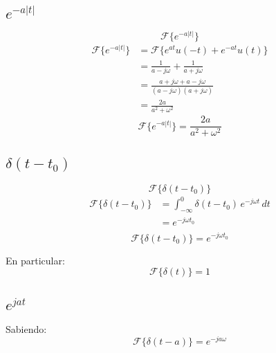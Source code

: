 \subsection{$e^{-a|t|}$}
\begin{equation*}
    \mathcal{F}\{e^{-a|t|}\}
\end{equation*}
\begin{equation*}
\begin{split}
    \mathcal{F}\{e^{-a|t|}\}
        &=\mathcal{F}\{e^{at}u(-t)+e^{-at}u(t)\}\\
        &=\frac{1}{a-j\omega}+\frac{1}{a+j\omega}\\
        &=\frac{a+j\omega+a-j\omega}{(a-j\omega)(a+j\omega)}\\
        &=\frac{2a}{a^2+\omega^2}
\end{split}
\end{equation*}
\begin{equation}
    \mathcal{F}\{e^{-a|t|}\}=\frac{2a}{a^2+\omega^2}
\end{equation}

\subsection{$\delta(t-t_0)$}
\begin{equation*}
    \mathcal{F}\{\delta(t-t_0)\}
\end{equation*}
\begin{equation*}
\begin{split}
    \mathcal{F}\{\delta(t-t_0)\}
        &=\int_{-\infty}^0\delta(t-t_0)\,e^{-j\omega t}\,dt\\
        &=e^{-j\omega t_0}\\
\end{split}
\end{equation*}
\begin{equation}
    \mathcal{F}\{\delta(t-t_0)\}=e^{-j\omega t_0}
\end{equation}

En particular:
\begin{equation*}
    \mathcal{F}\{\delta(t)\}=1
\end{equation*}

\subsection{$e^{jat}$}
Sabiendo:
\begin{equation*}
    \mathcal{F}\{\delta(t-a)\}=e^{-ja\omega}
\end{equation*}

